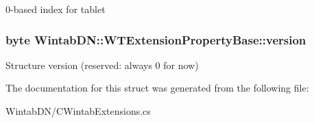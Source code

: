 0-\/based index for tablet 

\hypertarget{struct_wintab_d_n_1_1_w_t_extension_property_base_a3878c5d6db8c4e005e38f554f18ad267}{
\subsubsection[{version}]{\setlength{\rightskip}{0pt plus 5cm}byte {\bf WintabDN::WTExtensionPropertyBase::version}}}
\label{struct_wintab_d_n_1_1_w_t_extension_property_base_a3878c5d6db8c4e005e38f554f18ad267}


Structure version (reserved: always 0 for now) 



The documentation for this struct was generated from the following file:\begin{DoxyCompactItemize}
\item 
WintabDN/CWintabExtensions.cs\end{DoxyCompactItemize}

